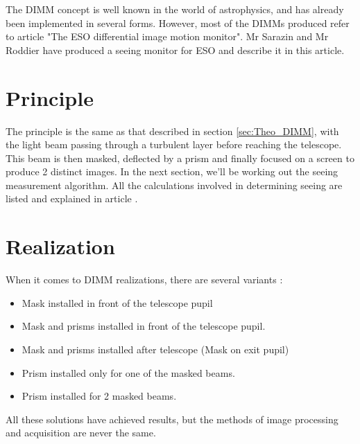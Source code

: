 The \Gls{DIMM} concept is well known in the world of astrophysics, and has already been implemented in several forms.
However, most of the \Gls{DIMM}s produced refer to article "The ESO differential image motion monitor". 
Mr Sarazin and Mr Roddier have produced 
a seeing monitor for ESO and describe it in this article.

\section{Principle}
The principle is the same as that described in section \ref{sec:Theo_DIMM}, with the light beam passing through a turbulent layer 
before reaching the telescope. This beam is then masked, deflected by a prism and finally focused on a screen to produce 
2 distinct images. In the next section, we'll be working out the seeing measurement algorithm. All the calculations involved 
in determining seeing are listed and explained in article \cite{DIMM_ESO}.
\section{Realization}
When it comes to \Gls{DIMM} realizations, there are several variants :
\begin{itemize}
    \item Mask installed in front of the telescope pupil
    \item Mask and prisms installed in front of the telescope pupil.
    \item Mask and prisms installed after telescope (Mask on exit pupil)
    \item Prism installed only for one of the masked beams.
    \item Prism installed for 2 masked beams.
\end{itemize}
All these solutions have achieved results, but the methods of image processing and acquisition are never the same.
